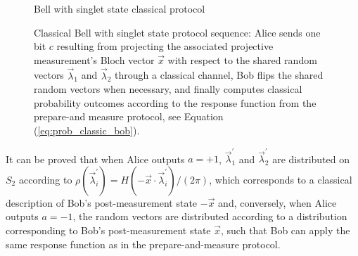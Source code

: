\begin{figure}[tb]
\begin{center}
\begin{msc}[msc keyword=, instance width=3.6cm]{Bell with singlet state classical protocol}
\nextlevel[3]
\nextlevel[3]
\nextlevel[1]
\nextlevel[3]
\nextlevel[2]
\end{msc}
\end{center}
\caption{Classical Bell with singlet state protocol sequence: Alice sends one bit $c$ resulting from projecting the associated projective measurement's Bloch vector $\vec{x}$ with respect to the shared random vectors $\vec{\lambda}_1$ and $\vec{\lambda}_2$ through a classical channel, Bob flips the shared random vectors when necessary, and finally computes classical probability outcomes according to the response function from the prepare-and measure protocol, see Equation (\ref{eq:prob_classic_bob}).}
\label{fig:msc_bell}
\end{figure}

It can be proved that when Alice outputs $a=+1$, $\vec{\lambda}^{\prime}_1$ and $\vec{\lambda}^{\prime}_2$ are distributed on $S_2$ according to $\rho(\vec{\lambda}^{\prime}_i) = H(-\vec{x} \cdot \vec{\lambda}^{\prime}_i)/(2\pi)$, which corresponds to a classical description of Bob's post-measurement state $-\vec{x}$ and, conversely, when Alice outputs $a=-1$, the random vectors are distributed according to a distribution corresponding to Bob's post-measurement state $\vec{x}$, such that Bob can apply the same response function as in the prepare-and-measure protocol. %